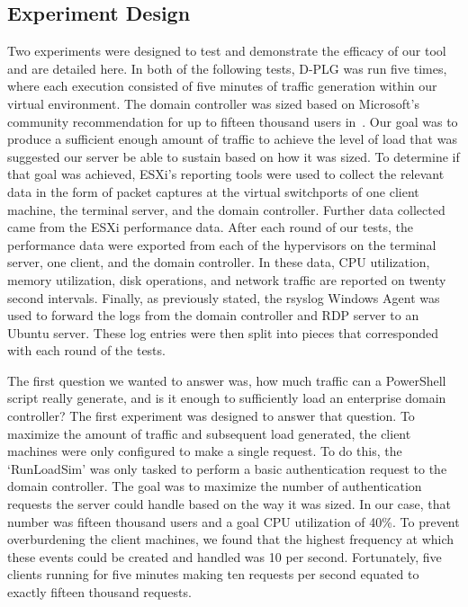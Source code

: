 \subsection{Experiment Design} \label{sec:experimentDesign}
Two experiments were designed to test and demonstrate the efficacy of our tool
and are detailed here.  In both of the following tests, D-PLG was run five
times, where each execution consisted of five minutes of traffic generation
within our virtual environment.  The domain controller was sized based on
Microsoft's community recommendation for up to fifteen thousand users
in~\cite{mak12}.  Our goal was to produce a sufficient enough amount of traffic
to achieve the level of load that was suggested our server be able to sustain
based on how it was sized.  To determine if that goal was achieved, ESXi's
reporting tools were used to collect the relevant data in the form of packet
captures at the virtual switchports of one client machine, the terminal server,
and the domain controller.  Further data collected came from the ESXi
performance data.  After each round of our tests, the performance data were
exported from each of the hypervisors on the terminal server, one client, and
the domain controller.  In these data, CPU utilization, memory utilization,
disk operations, and network traffic are reported on twenty second intervals.
Finally, as previously stated, the rsyslog Windows Agent was used to forward
the logs from the domain controller and RDP server to an Ubuntu server.  These
log entries were then split into pieces that corresponded with each round of
the tests.

The first question we wanted to answer was, how much traffic can a PowerShell
script really generate, and is it enough to sufficiently load an enterprise
domain controller?  The first experiment was designed to answer that question.
To maximize the amount of traffic and subsequent load generated, the client
machines were only configured to make a single request.  To do this, the
`RunLoadSim' was only tasked to perform a basic authentication request to the
domain controller.  The goal was to maximize the number of authentication
requests the server could handle based on the way it was sized.  In our case,
that number was fifteen thousand users and a goal CPU utilization of 40\%.  To
prevent overburdening the client machines, we found that the highest frequency
at which these events could be created and handled was 10 per second.
Fortunately, five clients running for five minutes making ten requests per
second equated to exactly fifteen thousand requests.  

